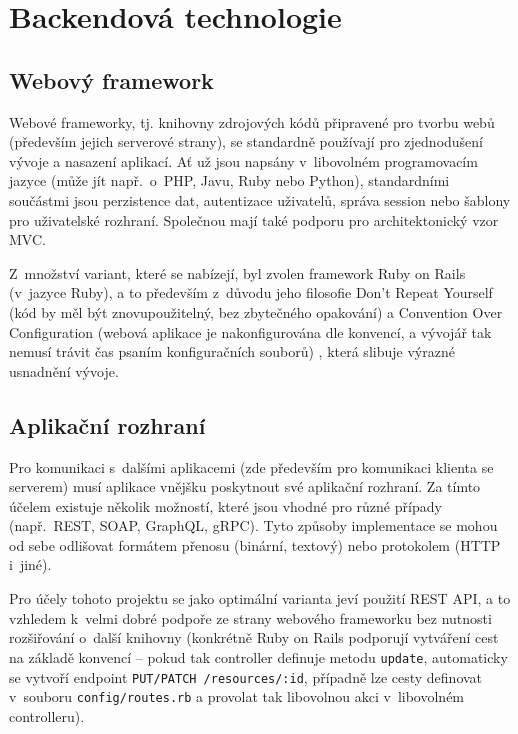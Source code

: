 \documentclass[twoside]{ctuthesis}
\begin{document}
\section{Backendová technologie}

\subsection{Webový framework}

Webové frameworky, tj. knihovny zdrojových kódů připravené pro tvorbu webů (především jejich serverové strany), se standardně používají pro zjednodušení vývoje a nasazení aplikací. Ať už jsou napsány v~libovolném programovacím jazyce (může jít např.~o~PHP, Javu, Ruby nebo Python), standardními součástmi jsou perzistence dat, autentizace uživatelů, správa session nebo šablony pro uživatelské rozhraní. Společnou mají také podporu pro architektonický vzor MVC. \cite{docforge2014web}

Z~množství variant, které se nabízejí, byl zvolen framework Ruby on Rails (v~jazyce Ruby), a to především z~důvodu jeho filosofie Don't Repeat Yourself (kód by měl být znovupoužitelný, bez zbytečného opakování) a Convention Over Configuration (webová aplikace je nakonfigurována dle konvencí, a vývojář tak nemusí trávit čas psaním konfiguračních souborů) \cite{rails2020}, která slibuje výrazné usnadnění vývoje.

\subsection{Aplikační rozhraní}

Pro komunikaci s~dalšími aplikacemi (zde především pro komunikaci klienta se serverem) musí aplikace vnějšku poskytnout své aplikační rozhraní. Za tímto účelem existuje několik možností, které jsou vhodné pro různé případy (např.~REST, SOAP, GraphQL, gRPC). Tyto způsoby implementace se mohou od sebe odlišovat formátem přenosu (binární, textový) nebo protokolem (HTTP i~jiné).

Pro účely tohoto projektu se jako optimální varianta jeví použití REST API, a to vzhledem k~velmi dobré podpoře ze strany webového frameworku bez nutnosti rozšiřování o~další knihovny (konkrétně Ruby on Rails podporují vytváření cest na základě konvencí – pokud tak controller definuje metodu \texttt{update}, automaticky se vytvoří endpoint \texttt{PUT/PATCH /resources/:id}, případně lze cesty definovat v~souboru \texttt{config/routes.rb} a provolat tak libovolnou akci v~libovolném controlleru).
\end{document}
